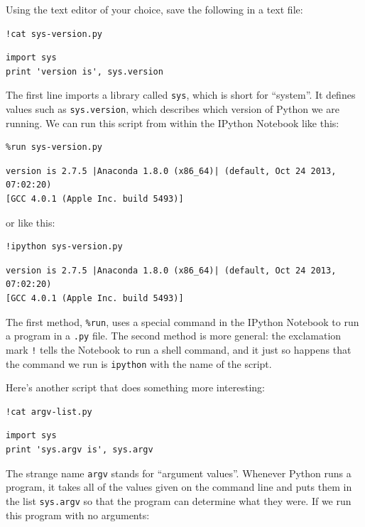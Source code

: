 \documentclass[]{book}
\begin{document}
Using the text editor of your choice, save the following in a text file:

\begin{verbatim}
!cat sys-version.py
\end{verbatim}

\begin{verbatim}
import sys
print 'version is', sys.version
\end{verbatim}

The first line imports a library called \texttt{sys}, which is short for
``system''. It defines values such as \texttt{sys.version}, which
describes which version of Python we are running. We can run this script
from within the IPython Notebook like this:

\begin{verbatim}
%run sys-version.py
\end{verbatim}

\begin{verbatim}
version is 2.7.5 |Anaconda 1.8.0 (x86_64)| (default, Oct 24 2013, 07:02:20)
[GCC 4.0.1 (Apple Inc. build 5493)]
\end{verbatim}

or like this:

\begin{verbatim}
!ipython sys-version.py
\end{verbatim}

\begin{verbatim}
version is 2.7.5 |Anaconda 1.8.0 (x86_64)| (default, Oct 24 2013, 07:02:20)
[GCC 4.0.1 (Apple Inc. build 5493)]
\end{verbatim}

The first method, \texttt{\%run}, uses a special command in the IPython
Notebook to run a program in a \texttt{.py} file. The second method is
more general: the exclamation mark \texttt{!} tells the Notebook to run
a shell command, and it just so happens that the command we run is
\texttt{ipython} with the name of the script.

Here's another script that does something more interesting:

\begin{verbatim}
!cat argv-list.py
\end{verbatim}

\begin{verbatim}
import sys
print 'sys.argv is', sys.argv
\end{verbatim}

The strange name \texttt{argv} stands for ``argument values''. Whenever
Python runs a program, it takes all of the values given on the command
line and puts them in the list \texttt{sys.argv} so that the program can
determine what they were. If we run this program with no arguments:
\end{document}
